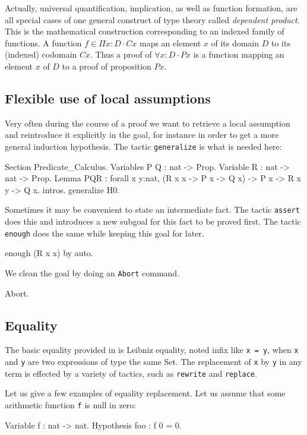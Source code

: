 \documentclass[11pt,a4paper]{book}
\begin{document}
Actually, universal quantification, implication, 
as well as function formation, are
all special cases of one general construct of type theory called
{\sl dependent product}. This is the mathematical construction 
corresponding to an indexed family of functions. A function 
$f\in \Pi x:D\cdot Cx$ maps an element $x$ of its domain $D$ to its
(indexed) codomain $Cx$. Thus a proof of $\forall x:D\cdot Px$ is
a function mapping an element $x$ of $D$ to a proof of proposition $Px$.


\subsection{Flexible use of local assumptions}

Very often during the course of a proof we want to retrieve a local
assumption and reintroduce it explicitly in the goal, for instance
in order to get a more general induction hypothesis. The tactic
\verb:generalize: is what is needed here:

\begin{coq_example}
Section Predicate_Calculus.
Variables P Q : nat -> Prop.
Variable R :  nat -> nat -> Prop.
Lemma PQR :
 forall x y:nat, (R x x -> P x -> Q x) -> P x -> R x y -> Q x.
intros.
generalize H0.
\end{coq_example}

Sometimes it may be convenient to state an intermediate fact.
The tactic \verb:assert: does this and introduces a new subgoal
for this fact to be proved first. The tactic \verb:enough: does
the same while keeping this goal for later.
\begin{coq_example}
enough (R x x) by auto.
\end{coq_example}
We clean the goal by doing an \verb:Abort: command.
\begin{coq_example*}
Abort.
\end{coq_example*}


\subsection{Equality}

The basic equality provided in \Coq{} is Leibniz equality, noted infix like
\texttt{x = y}, when \texttt{x} and \texttt{y} are two expressions of
type the same Set. The replacement of \texttt{x} by \texttt{y} in any
term is effected by a variety of tactics, such as \texttt{rewrite}
and \texttt{replace}.

Let us give a few examples of equality replacement. Let us assume that
some arithmetic function \verb:f: is null in zero:
\begin{coq_example}
Variable f : nat -> nat.
Hypothesis foo : f 0 = 0.
\end{coq_example}
\end{document}
